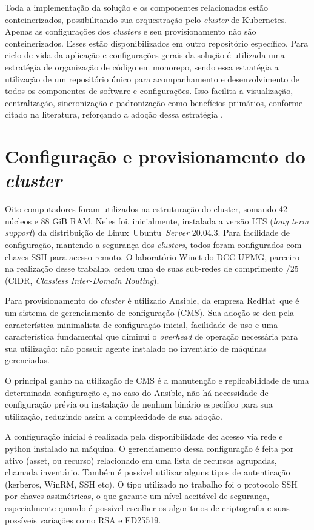 Toda a implementação da solução e os componentes relacionados estão conteinerizados, possibilitando  sua orquestração pelo  \emph{cluster} de Kubernetes\textregistered. Apenas as configurações dos  \emph{clusters} e seu provisionamento não são conteinerizados. Esses estão disponibilizados em outro repositório específico.
Para ciclo de vida da aplicação e configurações gerais da solução é utilizada uma estratégia de organização de código em monorepo, sendo essa estratégia a utilização de um repositório único para acompanhamento e desenvolvimento de todos os componentes de software e configurações. Isso facilita a visualização, centralização, sincronização e padronização como benefícios primários, conforme citado na literatura, reforçando a adoção dessa estratégia \cite{brito_monorepos_2018}.


\section{Configuração e provisionamento do  \emph{cluster}}

Oito computadores foram utilizados na estruturação do cluster, somando 42 núcleos e 88 GiB RAM. Neles foi, inicialmente, instalada a versão LTS (\emph{long term support}) da distribuição de Linux\textregistered \ Ubuntu\textregistered \ \emph{Server} {20.04.3}. Para facilidade de configuração, mantendo a segurança dos \emph{clusters}, todos foram configurados com chaves SSH para acesso remoto. O laboratório Winet do DCC UFMG, parceiro na realização desse trabalho, cedeu uma de suas sub-redes de comprimento /25 (CIDR, \emph{Classless Inter-Domain Routing}).

Para provisionamento do \emph{cluster} é utilizado Ansible\textregistered, da empresa RedHat\textregistered \ que é  um sistema de gerenciamento de configuração (CMS). Sua adoção se deu pela característica minimalista de configuração inicial, facilidade de uso e uma característica fundamental que diminui o \emph{overhead} de operação necessária para sua utilização: não possuir agente instalado no inventário de máquinas gerenciadas.

O principal ganho na utilização de CMS é a manutenção e replicabilidade de uma determinada configuração e, no caso do Ansible, não há necessidade de configuração prévia ou instalação de nenhum binário específico para sua utilização, reduzindo assim a complexidade de sua adoção.

A configuração inicial é realizada pela disponibilidade de: acesso via rede e python instalado na máquina. O gerenciamento dessa  configuração é feita por ativo (asset, ou recurso) relacionado em uma lista de recursos agrupadas, chamada inventário. Também é possível utilizar alguns tipos de autenticação (kerberos, WinRM, SSH etc). O tipo utilizado no trabalho foi o protocolo SSH \cite{noauthor_rfc4254_nodate} por chaves assimétricas, o que garante um nível aceitável de segurança, especialmente quando é possível escolher os algoritmos de criptografia e suas possíveis variações como RSA e ED25519.

